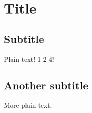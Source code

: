 \documentclass{article}
\begin{document}
\section{Title}

\subsection{Subtitle}

Plain text!
1
2
4!

\subsection{Another subtitle}

More plain text.
\end{document}
